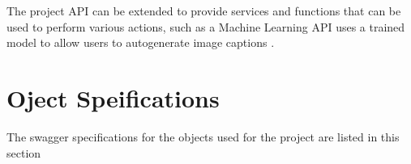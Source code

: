 The project API can be extended to provide services and functions that
can be used to perform various actions, such as a Machine Learning API
uses a trained model to allow users to autogenerate image captions
\cite{hid-sp18-503-image-cap}.


 

\appendix
\section{Oject Speifications}
The swagger specifications for the objects used for the project are listed
in this section






